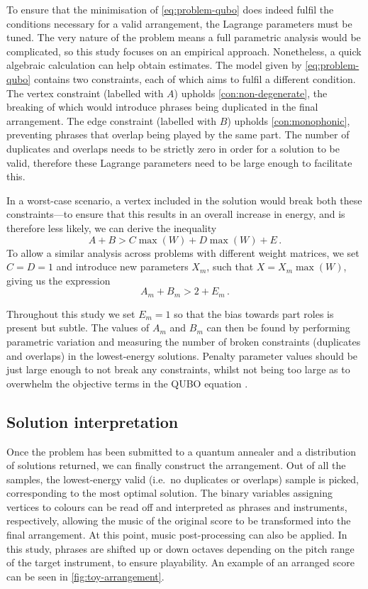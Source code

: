 \documentclass[twocolumn]{article}
\theoremstyle{definition}
\begin{document}
To ensure that the minimisation of \cref{eq:problem-qubo} does indeed fulfil the conditions necessary for a valid arrangement, the Lagrange parameters must be tuned. The very nature of the problem means a full parametric analysis would be complicated, so this study focuses on an empirical approach.
Nonetheless, a quick algebraic calculation can help obtain estimates. The model given by \cref{eq:problem-qubo} contains two constraints, each of which aims to fulfil a different condition. The vertex constraint (labelled with $A$) upholds \cref{con:non-degenerate}, the breaking of which would introduce phrases being duplicated in the final arrangement. The edge constraint (labelled with $B$) upholds \cref{con:monophonic}, preventing phrases that overlap being played by the same part. The number of duplicates and overlaps needs to be strictly zero in order for a solution to be valid, therefore these Lagrange parameters need to be large enough to facilitate this.

In a worst-case scenario, a vertex included in the solution would break both these constraints---to ensure that this results in an overall increase in energy, and is therefore less likely, we can derive the inequality
\begin{equation}
    A + B > C\max(W) + D\max(W) + E \,.
\end{equation}
To allow a similar analysis across problems with different weight matrices, we set ${C=D=1}$ and introduce new parameters $X_m$, such that ${X = X_m\max(W)}$, giving us the expression
\begin{equation}
    A_m + B_m > 2 + E_m \,.
    \label{eq:lagrange}
\end{equation}

Throughout this study we set $E_m=1$ so that the bias towards part roles is present but subtle. The values of $A_m$ and $B_m$ can then be found by performing parametric variation and measuring the number of broken constraints (duplicates and overlaps) in the lowest-energy solutions. Penalty parameter values should be just large enough to not break any constraints, whilst not being too large as to overwhelm the objective terms in the QUBO equation \cite{au-yeung_np-hard_2023}.

\subsection*{Solution interpretation}

Once the problem has been submitted to a quantum annealer and a distribution of solutions returned, we can finally construct the arrangement. Out of all the samples, the lowest-energy valid (i.e.\ no duplicates or overlaps) sample is picked, corresponding to the most optimal solution. The binary variables assigning vertices to colours can be read off and interpreted as phrases and instruments, respectively, allowing the music of the original score to be transformed into the final arrangement.
At this point, music post-processing can also be applied. In this study, phrases are shifted up or down octaves depending on the pitch range of the target instrument, to ensure playability. An example of an arranged score can be seen in \cref{fig:toy-arrangement}.
\end{document}
